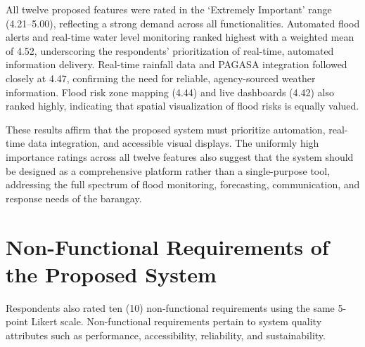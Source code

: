 \documentclass{research}
\begin{document}
All twelve proposed features were rated in the `Extremely Important' range (4.21--5.00),
reflecting a strong demand across all functionalities. Automated flood alerts and
real-time water level monitoring ranked highest with a weighted mean of 4.52,
underscoring the respondents' prioritization of real-time, automated information
delivery. Real-time rainfall data and PAGASA integration followed closely at 4.47,
confirming the need for reliable, agency-sourced weather information. Flood risk zone
mapping (4.44) and live dashboards (4.42) also ranked highly, indicating that spatial
visualization of flood risks is equally valued.
 
These results affirm that the proposed system must prioritize automation, real-time
data integration, and accessible visual displays. The uniformly high importance ratings
across all twelve features also suggest that the system should be designed as a
comprehensive platform rather than a single-purpose tool, addressing the full spectrum
of flood monitoring, forecasting, communication, and response needs of the barangay.
 
\section{Non-Functional Requirements of the Proposed System}
 
Respondents also rated ten (10) non-functional requirements using the same 5-point
Likert scale. Non-functional requirements pertain to system quality attributes such as
performance, accessibility, reliability, and sustainability.
 
\end{document}
